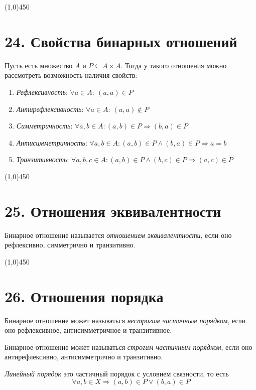 \documentclass[a4paper,12pt]{article}
\begin{document}
	\begin{center}
		\line(1,0){450}
	\end{center}

	\section*{24. Свойства бинарных отношений}
	Пусть есть множество $A$ и $P \subseteq A \times A$. Тогда у такого отношения можно рассмотреть возможность наличия свойств:
	\begin{enumerate}
		\item \textit{Рефлексивность}: $\forall a \in A:\ (a, a) \in P$
		\item \textit{Антирефлексивность}: $\forall a \in A:\ (a, a) \notin P$
		\item \textit{Симметричность}: $\forall a, b \in A: (a, b) \in P \Rightarrow (b, a) \in P$
		\item \textit{Антисимметричность}: $\forall a, b \in A: (a, b) \in P \land (b, a) \in P \Rightarrow a = b$
		\item \textit{Транзитивность}: $\forall a, b, c \in A: (a, b) \in P \land (b, c) \in P \Rightarrow (a, c) \in P$
	\end{enumerate}
	
	\begin{center}
		\line(1,0){450}
	\end{center}

	\section*{25. Отношения эквивалентности}
	Бинарное отношение называется \textit{отношением эквивалентности}, если оно рефлексивно, симметрично и транзитивно.
	
	\begin{center}
		\line(1,0){450}
	\end{center}

	\section*{26. Отношения порядка}
	Бинарное отношение может называться \textit{нестрогим частичным порядком}, если оно рефлексивное, антисимметричное и транзитивное.
	
	Бинарное отношение может называться \textit{строгим частичным порядком}, если оно антирефлексивно, антисимметрично и транзитивно.
	
	\textit{Линейный порядок} это частичный порядок с условием связности, то есть
	\[
	\forall a, b \in X \Rightarrow (a, b) \in P \lor (b, a) \in P 
	\]
	
\end{document}
